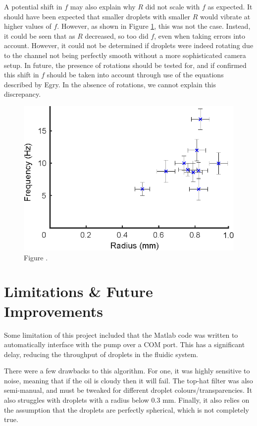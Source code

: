 \documentclass{physics_article_B}
\begin{document}
        A potential shift in $f$ may also explain why $R$ did not scale with $f$ as expected. It should have been expected that smaller droplets with smaller $R$ would vibrate at higher values of $f$. However, as shown in Figure \ref{fig:rvsf}, this was not the case. Instead, it could be seen that as $R$ decreased, so too did $f$, even when taking errors into account. However, it could not be determined if droplets were indeed rotating due to the channel not being perfectly smooth without a more sophisticated camera setup. In future, the presence of rotations should be tested for, and if confirmed this shift in $f$ should be taken into account through use of the equations described by Egry. In the absence of rotations, we cannot explain this discrepancy. 
        
        \begin{figure}[H]
            \centering
            \includegraphics{Figures/r_vs_f.eps}
            \caption{Figure .} 	
            \label{fig:rvsf}
        \end{figure} 
        
        
\section{Limitations \& Future Improvements\label{sect:limitations}}
    
    Some limitation of this project included that the Matlab code was written to automatically interface with the pump over a COM port. This has a significant delay, reducing the throughput of droplets in the fluidic system.
    
    There were a few drawbacks to this algorithm. For one, it was highly sensitive to noise, meaning that if the oil is cloudy then it will fail. The top-hat filter was also semi-manual, and must be tweaked for different droplet colours/transparencies. It also struggles with droplets with a radius below 0.3 mm. Finally, it also relies on the assumption that the droplets are perfectly spherical, which is not completely true.
    
\end{document}
